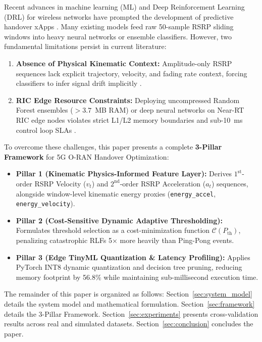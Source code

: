 \documentclass[conference]{IEEEtran}
\begin{document}
Recent advances in machine learning (ML) and Deep Reinforcement Learning (DRL) for wireless networks have prompted the development of predictive handover xApps \cite{kumar_scale_invariance, drl_handover_sun, traffic_steering_softwar, xapp_testbed_kazmi}. Many existing models feed raw 50-sample RSRP sliding windows into heavy neural networks or ensemble classifiers. However, two fundamental limitations persist in current literature:
\begin{enumerate}
    \item \textbf{Absence of Physical Kinematic Context:} Amplitude-only RSRP sequences lack explicit trajectory, velocity, and fading rate context, forcing classifiers to infer signal drift implicitly \cite{physics_ml_zhang, kinematic_fading_wang}.
    \item \textbf{RIC Edge Resource Constraints:} Deploying uncompressed Random Forest ensembles ($>3.7$~MB RAM) or deep neural networks on Near-RT RIC edge nodes violates strict L1/L2 memory boundaries and sub-10~ms control loop SLAs \cite{tinyml_wireless_ray, quantization_survey_gholami, pruned_trees_dinh}.
\end{enumerate}

To overcome these challenges, this paper presents a complete \textbf{3-Pillar Framework} for 5G O-RAN Handover Optimization:
\begin{itemize}
    \item \textbf{Pillar 1 (Kinematic Physics-Informed Feature Layer):} Derives $1^{\text{st}}$-order RSRP Velocity ($v_t$) and $2^{\text{nd}}$-order RSRP Acceleration ($a_t$) sequences, alongside window-level kinematic energy proxies (\texttt{energy\_accel}, \texttt{energy\_velocity}).
    \item \textbf{Pillar 2 (Cost-Sensitive Dynamic Adaptive Thresholding):} Formulates threshold selection as a cost-minimization function $\mathcal{C}(P_{\text{th}})$, penalizing catastrophic RLFs 5$\times$ more heavily than Ping-Pong events.
    \item \textbf{Pillar 3 (Edge TinyML Quantization \& Latency Profiling):} Applies PyTorch INT8 dynamic quantization and decision tree pruning, reducing memory footprint by 56.8\% while maintaining sub-millisecond execution time.
\end{itemize}

The remainder of this paper is organized as follows: Section~\ref{sec:system_model} details the system model and mathematical formulation. Section~\ref{sec:framework} details the 3-Pillar Framework. Section~\ref{sec:experiments} presents cross-validation results across real and simulated datasets. Section~\ref{sec:conclusion} concludes the paper.
\end{document}
